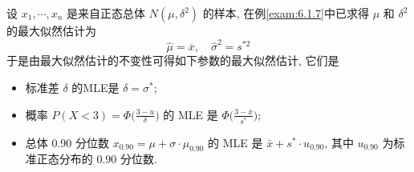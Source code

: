 \begin{example}
设 $x_1,\cdots,x_n$ 是来自正态总体 $N(\mu,\delta^2)$ 的样本, 在例\ref{exam:6.1.7}中已求得 $\mu$ 和 $\delta^2$ 的最大似然估计为
\[\hat{\mu}=\overline{x},\quad\hat{\sigma}^{2}=s^{*2}\]
于是由最大似然估计的不变性可得如下参数的最大似然估计, 它们是
\begin{itemize}
\item 标准差 $\delta$ 的MLE是 $\delta=\sigma^*$;
\item 概率 $P(X<3)=\Phi\big(\frac{3-u}{\delta}\big)$ 的 MLE 是 $\Phi\big(\frac{3-\bar{x}}{s^*}\big)$;
\item 总体 0.90 分位数 $x_{0.90}=\mu+\sigma\cdot\mu_{0.90}$ 的 MLE 是 $\bar{x}+s^{*}\cdot u_{0.90}$, 其中 $u_{0.90}$ 为标准正态分布的 0.90 分位数.
\end{itemize}
\end{example}



